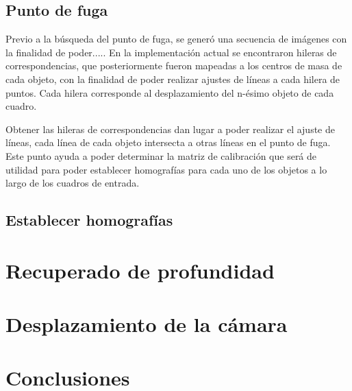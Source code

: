 \subsection{Punto de fuga}
Previo a la búsqueda del punto de fuga, se generó una secuencia de imágenes con la finalidad de poder..... 
En la implementación actual se encontraron hileras de correspondencias, que posteriormente fueron mapeadas a los centros de masa de cada objeto, con la finalidad de poder realizar ajustes de líneas a cada hilera de puntos. Cada hilera corresponde al desplazamiento del n-ésimo objeto de cada cuadro.

Obtener las hileras de correspondencias dan lugar a poder realizar el ajuste de líneas, cada línea de cada objeto intersecta a otras líneas en el punto de fuga. Este punto ayuda a poder determinar la matriz de calibración que será de utilidad para poder establecer homografías para cada uno de los objetos a lo largo de los cuadros de entrada.


\subsection{Establecer homografías}







\section{Recuperado de profundidad}
\section{Desplazamiento de la cámara}


\section{Conclusiones}







